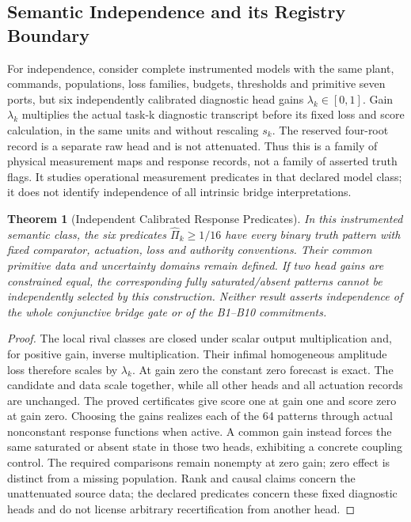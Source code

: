 \documentclass[11pt,a4paper]{article}
\newtheorem{theorem}{Theorem}[section]
\theoremstyle{definition}
\begin{document}
\subsection{Semantic Independence and its Registry Boundary}

For independence, consider complete instrumented models with the same plant,
commands, populations, loss families, budgets, thresholds and primitive seven
ports, but six independently calibrated diagnostic head gains
$\lambda_k\in[0,1]$. Gain $\lambda_k$ multiplies the actual task-k
diagnostic transcript before its fixed loss and score calculation, in the
same units and without rescaling $s_k$. The reserved four-root record is a
separate raw head and is not attenuated. Thus this is a family of physical
measurement maps and response records, not a family of asserted truth flags.
It studies operational measurement predicates in that declared model class;
it does not identify independence of all intrinsic bridge interpretations.

\begin{theorem}[Independent Calibrated Response Predicates]
\label{thm:predicate-independence}
In this instrumented semantic class, the six predicates
$\widehat\Pi_k\ge1/16$ have every binary truth pattern with fixed comparator,
actuation, loss and authority conventions. Their common primitive data and
uncertainty domains remain defined. If two head gains are constrained equal,
the corresponding fully saturated/absent patterns cannot be independently
selected by this construction. Neither result asserts independence of the
whole conjunctive bridge gate or of the B1--B10 commitments.
\end{theorem}
\begin{proof}
The local rival classes are closed under scalar output multiplication and,
for positive gain, inverse multiplication. Their infimal homogeneous
amplitude loss therefore scales by $\lambda_k$. At gain zero the constant
zero forecast is exact. The candidate and data scale together, while all
other heads and all actuation records are unchanged. The proved certificates
give score one at gain one and score zero at gain zero. Choosing the gains
realizes each of the 64 patterns through actual nonconstant response
functions when active. A common gain instead forces the same saturated or
absent state in those two heads, exhibiting a concrete coupling control.
The required comparisons remain nonempty at zero gain; zero effect is
distinct from a missing population. Rank and causal claims concern the
unattenuated source data; the declared predicates concern these fixed
diagnostic heads and do not license arbitrary recertification from another head.
\end{proof}
\end{document}
